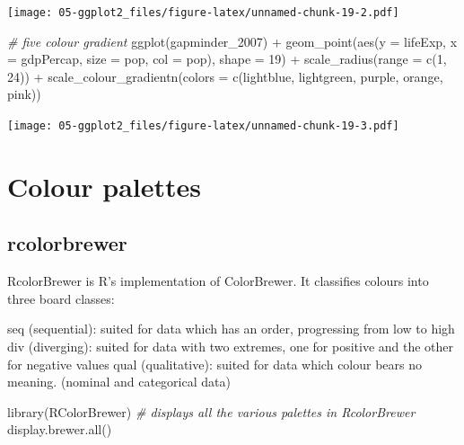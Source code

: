 \documentclass[
]{book}
\newenvironment{Shaded}{\begin{snugshade}}{\end{snugshade}}
\newcommand{\AttributeTok}[1]{\textcolor[rgb]{0.77,0.63,0.00}{#1}}
\newcommand{\CommentTok}[1]{\textcolor[rgb]{0.56,0.35,0.01}{\textit{#1}}}
\newcommand{\DecValTok}[1]{\textcolor[rgb]{0.00,0.00,0.81}{#1}}
\newcommand{\FunctionTok}[1]{\textcolor[rgb]{0.00,0.00,0.00}{#1}}
\newcommand{\NormalTok}[1]{#1}
\newcommand{\SpecialCharTok}[1]{\textcolor[rgb]{0.00,0.00,0.00}{#1}}
\newcommand{\StringTok}[1]{\textcolor[rgb]{0.31,0.60,0.02}{#1}}
\begin{document}
\texttt{[image: 05-ggplot2\_files/figure-latex/unnamed-chunk-19-2.pdf]}

\begin{Shaded}
\begin{Highlighting}[]
\CommentTok{\# five colour gradient}
\FunctionTok{ggplot}\NormalTok{(gapminder\_2007) }\SpecialCharTok{+} 
  \FunctionTok{geom\_point}\NormalTok{(}\FunctionTok{aes}\NormalTok{(}\AttributeTok{y =}\NormalTok{ lifeExp, }\AttributeTok{x =}\NormalTok{ gdpPercap, }\AttributeTok{size =}\NormalTok{ pop, }\AttributeTok{col =}\NormalTok{ pop), }\AttributeTok{shape =} \DecValTok{19}\NormalTok{) }\SpecialCharTok{+}
  \FunctionTok{scale\_radius}\NormalTok{(}\AttributeTok{range =} \FunctionTok{c}\NormalTok{(}\DecValTok{1}\NormalTok{, }\DecValTok{24}\NormalTok{)) }\SpecialCharTok{+}
  \FunctionTok{scale\_colour\_gradientn}\NormalTok{(}\AttributeTok{colors =} \FunctionTok{c}\NormalTok{(}\StringTok{\textquotesingle{}lightblue\textquotesingle{}}\NormalTok{, }\StringTok{\textquotesingle{}lightgreen\textquotesingle{}}\NormalTok{, }\StringTok{\textquotesingle{}purple\textquotesingle{}}\NormalTok{, }\StringTok{\textquotesingle{}orange\textquotesingle{}}\NormalTok{, }\StringTok{\textquotesingle{}pink\textquotesingle{}}\NormalTok{))}
\end{Highlighting}
\end{Shaded}

\texttt{[image: 05-ggplot2\_files/figure-latex/unnamed-chunk-19-3.pdf]}

\hypertarget{colour-palettes}{%
\section{Colour palettes}\label{colour-palettes}}

\hypertarget{rcolorbrewer}{%
\subsection{rcolorbrewer}\label{rcolorbrewer}}

RcolorBrewer is R's implementation of ColorBrewer. It classifies colours into three board classes:

seq (sequential): suited for data which has an order, progressing from low to high
div (diverging): suited for data with two extremes, one for positive and the other for negative values
qual (qualitative): suited for data which colour bears no meaning. (nominal and categorical data)

\begin{Shaded}
\begin{Highlighting}[]
\FunctionTok{library}\NormalTok{(RColorBrewer)}
\CommentTok{\# displays all the various palettes in RcolorBrewer}
\FunctionTok{display.brewer.all}\NormalTok{()}
\end{Highlighting}
\end{Shaded}
\end{document}
